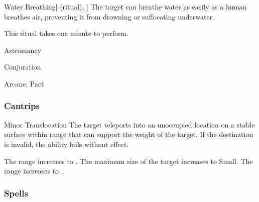 \lowercase{\hypertarget{spell:Water Breathing}{}}\label{spell:Water Breathing}
\begin{attuneability}[Rank 3]{\hypertarget{spell:Water Breathing}{Water Breathing}}[ (ritual), ]
The target can breathe water as easily as a human breathes air, preventing it from drowning or suffocating underwater.

This ritual takes one minute to perform.
\end{attuneability}
\vspace{0.25em}


\newpage
\begin{spellsection}{Astromancy}

\begin{spellheader}
\end{spellheader}


 Conjuration

 Arcane, Pact

\subsubsection{Cantrips}


\begin{freeability}{Minor Translocation}
The target teleports into an unoccupied location on a stable surface within range that can support the weight of the target.
If the destination is invalid, the ability fails without effect.

\rankline
{} The range increases to \rngmed.
 The maximum size of the target increases to Small.
 The range increases to \rnglong.
\end{freeability}

\end{spellsection}


\subsubsection{Spells}


